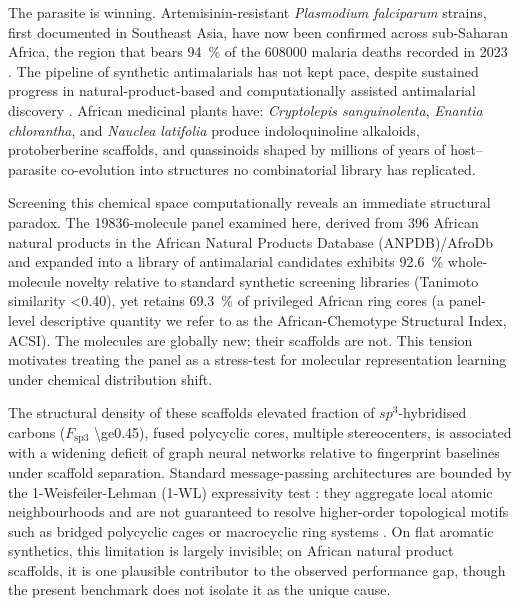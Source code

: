 \documentclass[11pt,a4paper]{article}
\begin{document}
The parasite is winning. Artemisinin-resistant \emph{Plasmodium falciparum} strains, first documented in Southeast Asia, have now been confirmed across sub-Saharan Africa, the region that bears \qty{94}{\percent} of the \num{608000} malaria deaths recorded in 2023 \citep{who2024malariareport,ariyey2014,ashley2018}. The pipeline of synthetic antimalarials has not kept pace, despite sustained progress in natural-product-based and computationally assisted antimalarial discovery \citep{tandfonline2026antimalarialreview,ferreira2021qsar,mbahbake2025pfldh,value_addition_african_np_2025}. African medicinal plants have: \emph{Cryptolepis sanguinolenta}, \emph{Enantia chlorantha}, and \emph{Nauclea latifolia} produce indoloquinoline alkaloids, protoberberine scaffolds, and quassinoids shaped by millions of years of host--parasite co-evolution into structures no combinatorial library has replicated.

Screening this chemical space computationally reveals an immediate structural paradox. The \num{19836}-molecule panel examined here, derived from \num{396} African natural products in the African Natural Products Database (ANPDB)/AfroDb \citep{anpdb_2026} and expanded into a library of antimalarial candidates \citep{temgoua2026antimalarial} exhibits \qty{92.6}{\percent} whole-molecule novelty relative to standard synthetic screening libraries (Tanimoto similarity \num{<0.40}), yet retains \qty{69.3}{\percent} of privileged African ring cores (a panel-level descriptive quantity we refer to as the African-Chemotype Structural Index, ACSI). The molecules are globally new; their scaffolds are not. This tension motivates treating the panel as a stress-test for molecular representation learning under chemical distribution shift.

The structural density of these scaffolds elevated fraction of $sp^3$-hybridised carbons ($F_{\mathrm{sp3}}$ \num{\ge0.45}), fused polycyclic cores, multiple stereocenters, is associated with a widening deficit of graph neural networks relative to fingerprint baselines under scaffold separation. Standard message-passing architectures are bounded by the 1-Weisfeiler-Lehman (1-WL) expressivity test \citep{xu2019gin,morris2019wlgo,zhang2024beyondwl}: they aggregate local atomic neighbourhoods and are not guaranteed to resolve higher-order topological motifs such as bridged polycyclic cages or macrocyclic ring systems \citep{wieder2020compact}. On flat aromatic synthetics, this limitation is largely invisible; on African natural product scaffolds, it is one plausible contributor to the observed performance gap, though the present benchmark does not isolate it as the unique cause.
\end{document}
